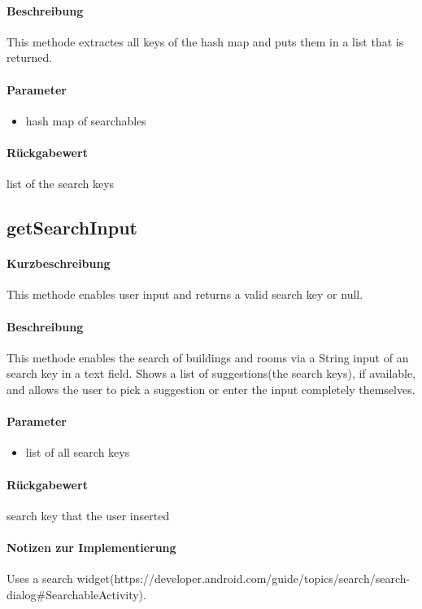 \paragraph*{Beschreibung}
This methode extractes all keys of the hash map and puts them in a list that is returned.
\paragraph*{Parameter}
\begin{itemize}
    \item hash map of searchables
\end{itemize}
\paragraph*{Rückgabewert}
list of the search keys

\subsection{getSearchInput}%
\paragraph*{Kurzbeschreibung}
This methode enables user input and returns a valid search key or null.
\paragraph*{Beschreibung}
This methode enables the search of buildings and rooms via a String input of an search key in a text field.
Shows a list of suggestions(the search keys), if available, and allows the user to pick a suggestion or enter the input completely themselves.
\paragraph*{Parameter}
\begin{itemize}
    \item list of all search keys
\end{itemize}
\paragraph*{Rückgabewert}
search key that the user inserted
\paragraph*{Notizen zur Implementierung}
Uses a search widget(https://developer.android.com/guide/topics/search/search-dialog#SearchableActivity).

